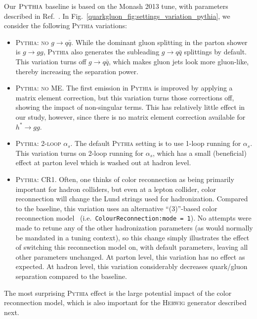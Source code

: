 \documentclass[11pt]{cernrep}
\begin{document}
Our $\textsc{Pythia}$ baseline is based on the Monash 2013 tune, with parameters described in Ref.~\cite{Skands:2014pea}.  In Fig.~\ref{quarkgluon_fig:settings_variation_pythia}, we consider the following \textsc{Pythia} variations:
\begin{itemize}
\item \textsc{Pythia: no $g \to q\bar{q}$}.  While the dominant gluon splitting in the parton shower is $g \to gg$, \textsc{Pythia} also generates the subleading $g \to q \bar{q}$ splittings by default.  This variation turns off $g \to q \bar{q}$, which makes gluon jets look more gluon-like, thereby increasing the separation power.
\item \textsc{Pythia: no ME}.  The first emission in \textsc{Pythia} is improved by applying a matrix element correction, but this variation turns those corrections off, showing the impact of non-singular terms.  This has relatively little effect in our study, however, since there is no matrix element correction available for $h^* \to g g$.
\item \textsc{Pythia: 2-loop $\alpha_s$}.  The default \textsc{Pythia} setting is to use 1-loop running for $\alpha_s$.  This variation turns on 2-loop running for $\alpha_s$, which has a small (beneficial) effect at parton level which is washed out at hadron level.
\item \textsc{Pythia: CR1}.  Often, one thinks of color reconnection as being primarily important for hadron colliders, but even at a lepton collider, color reconnection will change the Lund strings used for hadronization.  Compared to the baseline, this variation uses an alternative ``(3)''-based color reconnection model~\cite{Christiansen:2015yqa} (i.e.~\texttt{ColourReconnection:mode = 1}).  No attempts were made to retune any of the other hadronization parameters (as would normally be mandated in a tuning context), so this change simply illustrates the effect of switching this reconnection model on, with default parameters, leaving all other parameters unchanged.  At parton level, this variation has no effect as expected.  At hadron level, this variation considerably decreases quark/gluon separation compared to the baseline.
\end{itemize}
The most surprising \textsc{Pythia} effect is the large potential impact of the color reconnection model, which is also important for the \textsc{Herwig} generator described next.
\end{document}
